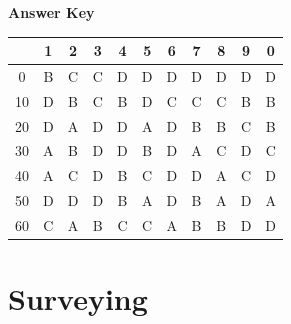 \documentclass[11pt,a4paper]{article}
\begin{document}
\textbf{Answer Key}
\begin{tabular}{ | c | c c c c c c c c c c | }
\hline
 & 1 & 2 & 3 & 4 & 5 & 6 & 7 & 8 & 9 & 0 \\
\hline
0 & B & C & C & D & D & D & D & D & D & D \\
10 & D & B & C & B & D & C & C & C & B & B \\
20 & D & A & D & D & A & D & B & B & C & B \\
30 & A & B & D & D & B & D & A & C & D & C \\
40 & A & C & D & B & C & D & D & A & C & D \\
50 & D & D & D & B & A & D & B & A & D & A \\
60 & C & A & B & C & C & A & B & B & D & D \\
\hline
\end{tabular}
\clearpage
\section{Surveying}
\end{document}
